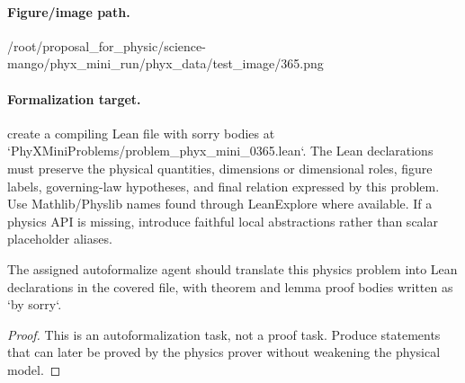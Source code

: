 \paragraph{Figure/image path.}
/root/proposal\_for\_physic/science-mango/phyx\_mini\_run/phyx\_data/test\_image/365.png

\paragraph{Formalization target.}
create a compiling Lean file with sorry bodies at `PhyXMiniProblems/problem\_phyx\_mini\_0365.lean`. The Lean declarations must preserve the physical quantities, dimensions or dimensional roles, figure labels, governing-law hypotheses, and final relation expressed by this problem.
Use Mathlib/Physlib names found through LeanExplore where available. If a physics API is missing, introduce faithful local abstractions rather than scalar placeholder aliases.

\begin{theorem}
\label{thm:physics:phyx_mini_0365:target}
The assigned autoformalize agent should translate this physics problem into Lean declarations in the covered file, with theorem and lemma proof bodies written as `by sorry`.
\end{theorem}
\begin{proof}
This is an autoformalization task, not a proof task. Produce statements that can later be proved by the physics prover without weakening the physical model.
\end{proof}

